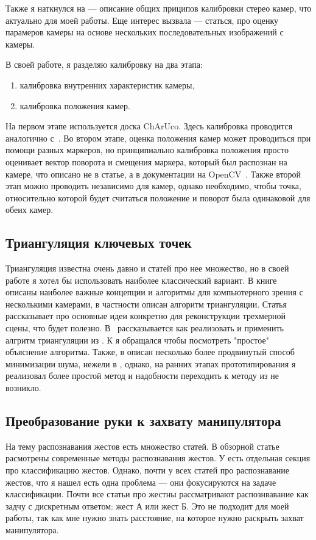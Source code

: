 \documentclass[12pt, a4paper]{article}
\begin{document}
Также я наткнулся на \cite{three-stereo-principals} --- описание общих приципов
калибровки стерео камер, что актуально для моей работы. Еще интерес вызвала
\cite{camera-self-calibration} --- статься, про оценку парамеров камеры на
основе нескольких последовательных изображений с камеры.

В своей работе, я разделяю калибровку на два этапа:
\begin{enumerate}
    \item калибровка внутренних характеристик камеры,
    \item калибровка положения камер.
\end{enumerate}
На первом этапе используется доска ChArUco. Здесь калибровка проводится
аналогично с~\cite{opencv_charuco}. Во втором этапе, оценка положения камер
может проводиться при помощи разных маркеров, но принципиально калибровка
положения просто оценивает вектор поворота и смещения маркера, который был
распознан на камере, что описано не в статье, а в документации на
OpenCV~\cite{opencv_charuco_pose}. Также второй этап можно проводить независимо
для камер, однако необходимо, чтобы точка, относительно которой будет считаться
положение и поворот была одинаковой для обеих камер.

\subsection{Триангуляция ключевых точек}
Триангуляция известна очень давно и статей про нее множество, но в своей работе
я хотел бы использовать наиболее классический вариант. В
книге~\cite{multiview_cv} описаны наиболее важные концепции и алгоритмы для
компьютерного зрения с несколькими камерами, в частности описан алгоритм
триангуляции. Статья \cite{basics-of-reconstruction} рассказывает про основные
идеи конкретно для реконструкции трехмерной сцены, что будет полезно.
В~\cite{dlt_temugeb} рассказывается как реализовать и применить алгритм
триангуляции из \cite{multiview_cv}. К \cite{dlt_temugeb} я обращался чтобы
посмотреть "простое" объяснение алгоритма. Также, в \cite{multiview_cv} описан
несколько более продвинутый способ минимизации шума, нежели в
\cite{dlt_temugeb}, однако, на ранних этапах прототипирования я реализовал
более простой метод и надобности переходить к методу из \cite{multiview_cv} не
возникло.

\subsection{Преобразование руки к захвату манипулятора}
На тему распознавания жестов есть множество статей. В обзорной статье
\cite{gesture-survey} расмотрены современные методы распознавания жестов.
У \cite{mediapipe_paper} есть отдельная секция про классификацию жестов.
Однако, почти у всех статей про распознавание жестов, что я нашел есть одна
проблема --- они фокусируются на задаче классификации. Почти все статьи про
жестны рассматривают распознвавание как задчу с дискретным ответом: жест А или
жест Б. Это не подходит для моей работы, так как мне нужно знать расстояние, на
которое нужно раскрыть захват манипулятора.
\end{document}
